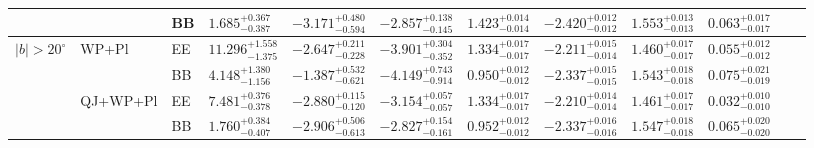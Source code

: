 \begin{table}[h]
\begin{adjustbox}{center}
{\begin{tabular}{llllcccccccc}
 &          & BB & $1.685^{+0.367}_{-0.387}$ & $-3.171^{+0.480}_{-0.594}$ & $-2.857^{+0.138}_{-0.145}$ & $1.423^{+0.014}_{-0.014}$ & $-2.420^{+0.012}_{-0.012}$ & $1.553^{+0.013}_{-0.013}$ & $0.063^{+0.017}_{-0.017}$ \\
\midrule
\multirow{4}{*}{$|b|>20^\circ$}
 & WP+Pl    & EE & $11.296^{+1.558}_{-1.375}$ & $-2.647^{+0.211}_{-0.228}$ & $-3.901^{+0.304}_{-0.352}$ & $1.334^{+0.017}_{-0.017}$ & $-2.211^{+0.015}_{-0.014}$ & $1.460^{+0.017}_{-0.017}$ & $0.055^{+0.012}_{-0.012}$ \\
 &          & BB & $4.148^{+1.380}_{-1.156}$ & $-1.387^{+0.532}_{-0.621}$ & $-4.149^{+0.743}_{-0.914}$ & $0.950^{+0.012}_{-0.012}$ & $-2.337^{+0.015}_{-0.015}$ & $1.543^{+0.018}_{-0.018}$ & $0.075^{+0.021}_{-0.019}$ \\
 & QJ+WP+Pl & EE & $7.481^{+0.376}_{-0.378}$ & $-2.880^{+0.115}_{-0.120}$ & $-3.154^{+0.057}_{-0.057}$ & $1.334^{+0.017}_{-0.017}$ & $-2.210^{+0.014}_{-0.014}$ & $1.461^{+0.017}_{-0.017}$ & $0.032^{+0.010}_{-0.010}$ \\
 &          & BB & $1.760^{+0.384}_{-0.407}$ & $-2.906^{+0.506}_{-0.613}$ & $-2.827^{+0.154}_{-0.161}$ & $0.952^{+0.012}_{-0.012}$ & $-2.337^{+0.016}_{-0.016}$ & $1.547^{+0.018}_{-0.018}$ & $0.065^{+0.020}_{-0.020}$ \\
\bottomrule
\end{tabular}}
\end{adjustbox}
\end{table}